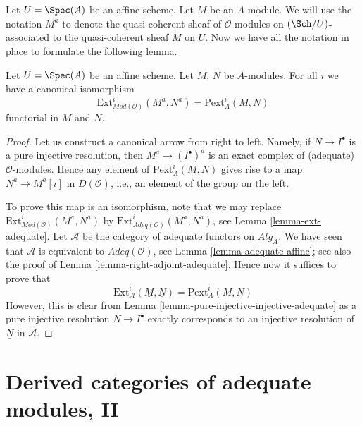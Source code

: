 \noindent
Let $U = \Spec(A)$ be an affine scheme. Let $M$ be an $A$-module.
We will use the notation $M^a$ to denote the quasi-coherent sheaf
of $\mathcal{O}$-modules on $(\Sch/U)_\tau$ associated to
the quasi-coherent sheaf $\widetilde{M}$ on $U$.
Now we have all the notation in place to formulate the following lemma.

\begin{lemma}
\label{lemma-big-ext}
Let $U = \Spec(A)$ be an affine scheme. Let $M$, $N$ be $A$-modules.
For all $i$ we have a canonical isomorphism
$$
\text{Ext}^i_{\textit{Mod}(\mathcal{O})}(M^a, N^a) = \text{Pext}^i_A(M, N)
$$
functorial in $M$ and $N$.
\end{lemma}

\begin{proof}
Let us construct a canonical arrow from right to left. Namely, if
$N \to I^\bullet$ is a pure injective resolution, then
$M^a \to (I^\bullet)^a$ is an exact complex of (adequate)
$\mathcal{O}$-modules. Hence any element of $\text{Pext}^i_A(M, N)$
gives rise to a map $N^a \to M^a[i]$ in $D(\mathcal{O})$, i.e.,
an element of the group on the left.

\medskip\noindent
To prove this map is an isomorphism, note that we may replace
$\text{Ext}^i_{\textit{Mod}(\mathcal{O})}(M^a, N^a)$ by
$\text{Ext}^i_{\textit{Adeq}(\mathcal{O})}(M^a, N^a)$, see
Lemma \ref{lemma-ext-adequate}.
Let $\mathcal{A}$ be the category of adequate functors
on $\textit{Alg}_A$. We have seen that $\mathcal{A}$ is
equivalent to $\textit{Adeq}(\mathcal{O})$, see
Lemma \ref{lemma-adequate-affine}; see also the proof of
Lemma \ref{lemma-right-adjoint-adequate}.
Hence now it suffices to prove that
$$
\text{Ext}^i_\mathcal{A}(\underline{M}, \underline{N}) =
\text{Pext}^i_A(M, N)
$$
However, this is clear from
Lemma \ref{lemma-pure-injective-injective-adequate}
as a pure injective resolution $N \to I^\bullet$ exactly corresponds
to an injective resolution of $\underline{N}$ in $\mathcal{A}$.
\end{proof}







\section{Derived categories of adequate modules, II}
\label{section-derived-categories}

